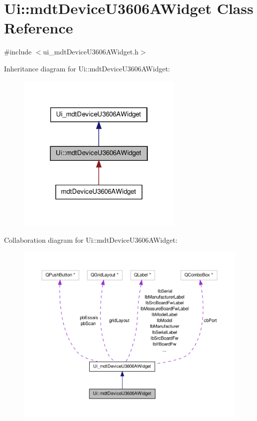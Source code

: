 \hypertarget{class_ui_1_1mdt_device_u3606_a_widget}{\section{Ui\-:\-:mdt\-Device\-U3606\-A\-Widget Class Reference}
\label{class_ui_1_1mdt_device_u3606_a_widget}
}


{\ttfamily \#include $<$ui\-\_\-mdt\-Device\-U3606\-A\-Widget.\-h$>$}



Inheritance diagram for Ui\-:\-:mdt\-Device\-U3606\-A\-Widget\-:
\nopagebreak
\begin{figure}[H]
\begin{center}
\leavevmode
\includegraphics[width=226pt]{class_ui_1_1mdt_device_u3606_a_widget__inherit__graph}
\end{center}
\end{figure}


Collaboration diagram for Ui\-:\-:mdt\-Device\-U3606\-A\-Widget\-:
\nopagebreak
\begin{figure}[H]
\begin{center}
\leavevmode
\includegraphics[width=350pt]{class_ui_1_1mdt_device_u3606_a_widget__coll__graph}
\end{center}
\end{figure}
